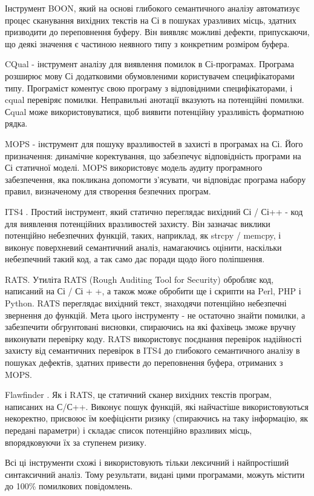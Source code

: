 Інструмент BOON, який на основі глибокого семантичного аналізу автоматизує процес сканування вихідних текстів на Сі в пошуках уразливих місць, здатних призводити до переповнення буферу. Він виявляє можливі дефекти, припускаючи, що деякі значення є частиною неявного типу з конкретним розміром буфера.

CQual - інструмент аналізу для виявлення помилок в Сі-програмах. Програма розширює мову Сі додатковими обумовленими користувачем специфікаторами типу. Програміст коментує свою програму з відповідними специфікаторами, і cqual перевіряє помилки. Неправильні анотації вказують на потенційні помилки. Сqual може використовуватися, щоб виявити потенційну уразливість форматною рядка.

MOPS - інструмент для пошуку вразливостей в захисті в програмах на Сі. Його призначення: динамічне коректування, що забезпечує відповідність програми на Сі статичної моделі. MOPS використовує модель аудиту програмного забезпечення, яка покликана допомогти з'ясувати, чи відповідає програма набору правил, визначеному для створення безпечних програм.

ITS4 . Простий інструмент, який статично переглядає вихідний Сі / Сі++ - код для виявлення потенційних вразливостей захисту. Він зазначає виклики потенційно небезпечних функцій, таких, наприклад, як strcpy / memcpy, і виконує поверхневий семантичний аналіз, намагаючись оцінити, наскільки небезпечний такий код, а так само дає поради щодо його поліпшення.

RATS. Утиліта RATS (Rough Auditing Tool for Security) обробляє код, написаний на Сі / Сі + +, а також може обробити ще і скрипти на Perl, PHP і Python. RATS переглядає вихідний текст, знаходячи потенційно небезпечні звернення до функцій. Мета цього інструменту - не остаточно знайти помилки, а забезпечити обгрунтовані висновки, спираючись на які фахівець зможе вручну виконувати перевірку коду. RATS використовує поєднання перевірок надійності захисту від семантичних перевірок в ITS4 до глибокого семантичного аналізу в пошуках дефектів, здатних привести до переповнення буфера, отриманих з MOPS.

Flawfinder . Як і RATS, це статичний сканер вихідних текстів програм, написаних на С/С++. Виконує пошук функцій, які найчастіше використовуються некоректно, присвоює їм коефіцієнти ризику (спираючись на таку інформацію, як передані параметри) і складає список потенційно вразливих місць, впорядковуючи їх за ступенем ризику.

Всі ці інструменти схожі і використовують тільки лексичний і найпростіший синтаксичний аналіз. Тому результати, видані цими програмами, можуть містити до 100\% помилкових повідомлень.

